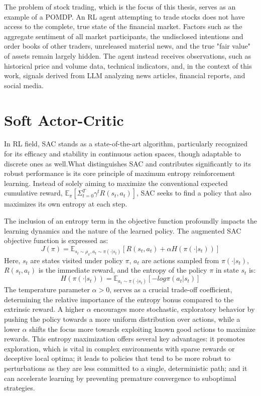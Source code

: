 The problem of stock trading, which is the focus of this thesis, serves as an example of a \gls{POMDP}. An \gls{RL} agent attempting to trade stocks does not have access to the complete, true state of the financial market. Factors such as the aggregate sentiment of all market participants, the undisclosed intentions and order books of other traders, unreleased material news, and the true "fair value" of assets remain largely hidden. The agent instead receives observations, such as historical price and volume data, technical indicators, and, in the context of this work, signals derived from \gls{LLM} analyzing news articles, financial reports, and social media.

\section{Soft Actor-Critic}
\label{sec:sac}
In \gls{RL} field, \gls{SAC} stands as a state-of-the-art algorithm, particularly recognized for its efficacy and stability in continuous action spaces, though adaptable to discrete ones as well.What distinguishes \gls{SAC} and contributes significantly to its robust performance is its core principle of maximum entropy reinforcement learning. Instead of solely aiming to maximize the conventional expected cumulative reward, \(\mathbb{E}_\pi[\Sigma_{t=0}^T \gamma^t R(s_t, a_t)]\), \gls{SAC} seeks to find a policy that also maximizes its own entropy at each step.

The inclusion of an entropy term in the objective function profoundly impacts the learning dynamics and the nature of the learned policy. The augmented \gls{SAC} objective function is expressed as:
\[J(\pi) = \mathbb{E}_{s_t \sim \rho_\pi, a_t \sim \pi(\cdot|s_t)} [R(s_t, a_t) + \alpha H(\pi(\cdot|s_t))]\]
Here, \(s_t\) are states visited under policy \(\pi\), \(a_t\) are actions sampled from \(\pi(\cdot|s_t)\), \(R(s_t, a_t)\) is the immediate reward, and the entropy of the policy \(\pi\) in state \(s_t\) is:
\[H(\pi(\cdot|s_t)) = \mathbb{E}_{a_t \sim \pi(\cdot|s_t)}[-log \pi(a_t|s_t)]\]
The temperature parameter \(\alpha > 0\), serves as a crucial trade-off coefficient, determining the relative importance of the entropy bonus compared to the extrinsic reward. A higher \(\alpha\) encourages more stochastic, exploratory behavior by pushing the policy towards a more uniform distribution over actions, while a lower \(\alpha\) shifts the focus more towards exploiting known good actions to maximize rewards. This entropy maximization offers several key advantages: it promotes exploration, which is vital in complex environments with sparse rewards or deceptive local optima; it leads to policies that tend to be more robust to perturbations as they are less committed to a single, deterministic path; and it can accelerate learning by preventing premature convergence to suboptimal strategies.

